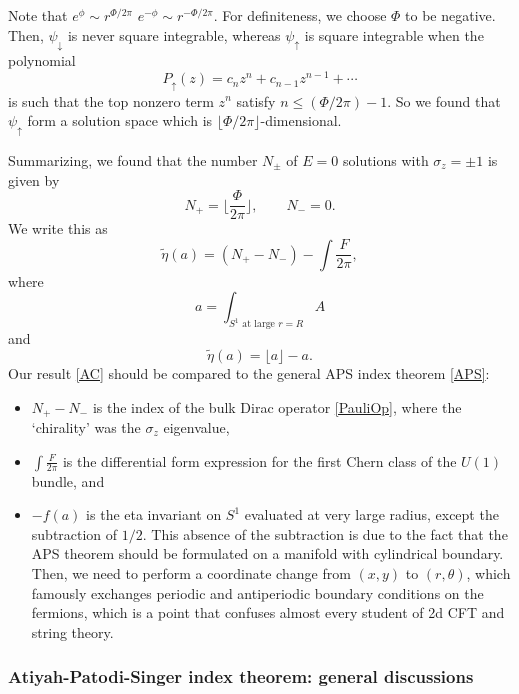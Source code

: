 \documentclass[12pt]{article}
\numberwithin{equation}{section}
\numberwithin{figure}{section}
\theoremstyle{remark}
\begin{document}
Note that $e^{\phi} \sim r^{\Phi/2\pi}$ $e^{-\phi} \sim r^{-\Phi/2\pi}$.
For definiteness, we choose $\Phi$ to be negative.
Then, $\psi_\downarrow$ is never square integrable,
whereas $\psi_\uparrow$ is square integrable when the polynomial 
\begin{equation}
P_\uparrow( z)=c_n  z^n + c_{n-1}  z^{n-1}+ \cdots
\end{equation}
is such that the top nonzero term $z^n$ satisfy $n \le (\Phi/2\pi)-1$.
So we found that $\psi_\uparrow$ form a solution space
which is  $\lfloor \Phi/2\pi\rfloor$-dimensional.

Summarizing, we found that the number $N_\pm$ of $E=0$ solutions 
with $\sigma_z=\pm1$ is given by \begin{equation}
N_+ =\lfloor  \frac{\Phi}{2\pi}  \rfloor, \qquad N_-=0.
\end{equation}
We write this as \begin{equation}
\tilde\eta(a)= (N_+-N_-) -\int \frac{F}{2\pi}, 
\label{AC}
\end{equation} where \begin{equation}
a=\int_{\text{$S^1$ at large $r=R$}} A
\end{equation} and \begin{equation}
\tilde\eta(a)=\lfloor a\rfloor-a.
\end{equation}
Our result \eqref{AC} should be compared to the general APS index theorem \eqref{APS}:
\begin{itemize}
\item $N_+-N_-$ is the index of the bulk Dirac operator \eqref{PauliOp},
where the `chirality' was the $\sigma_z$ eigenvalue, 
\item $\int \frac{F}{2\pi}$ is the differential form expression for the first Chern class of the $U(1)$ bundle, and
\item $-f(a)$ is the eta invariant on $S^1$ evaluated at very large radius, except the subtraction of $1/2$.
This absence of the subtraction is due to the fact that the APS theorem should be formulated
on a manifold with cylindrical boundary. Then, we need to perform a coordinate change 
from $(x,y)$ to $(r,\theta)$, which famously exchanges periodic and antiperiodic boundary conditions 
on the fermions, which is a point that confuses almost every student of 2d CFT and string theory.
\end{itemize}

\subsubsection{Atiyah-Patodi-Singer index theorem: general discussions}
\end{document}

